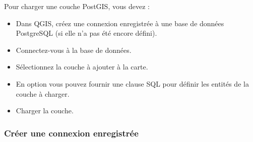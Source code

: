 Pour charger une couche PostGIS, vous devez :

\begin{itemize}
\item Dans QGIS, créez une connexion enregistrée à une base de données PostgreSQL (si elle n'a pas été encore défini).
\item Connectez-vous à la base de données.
\item Sélectionnez la couche à ajouter à la carte.
\item En option vous pouvez fournir une clause SQL  pour définir les entités de la couche à charger.
\item Charger la couche.
\end{itemize}

\subsubsection{Créer une connexion enregistrée}\label{sec:postgis_stored}

